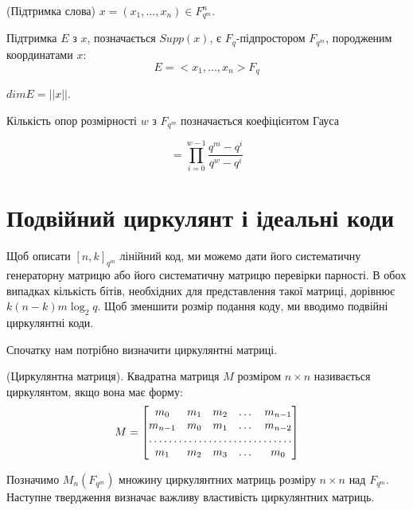 \begin{definition} (Підтримка слова)
    $x = (x_1, ..., x_n) \in F_{q^m}^n$. 

    Підтримка $E$ з $x$, позначається $Supp(x)$, є $F_q$-підпростором $F_{q^m}$, породженим координатами $x$:
    \begin{equation}
        E = <x_1,...,x_n>F_q
    \end{equation}

    $dimE = ||x||$.

    Кількість опор розмірності $w$ з $F_{q^m}$ позначається коефіцієнтом Гауса

    \begin{equation}
        [\dfrac{m}{w}] = \prod_{i=0}^{w-1} \dfrac{q^m - q^i}{q^w - q^i}
    \end{equation}
\end{definition}

\section{Подвійний циркулянт і ідеальні коди}

Щоб описати $[n,k]_{q^m}$ лінійний код, ми можемо дати його систематичну генераторну матрицю або його систематичну матрицю перевірки парності. 
В обох випадках кількість бітів, необхідних для представлення такої матриці, 
дорівнює $k(n-k)m \log_2 q$. Щоб зменшити розмір подання коду, ми вводимо подвійні циркулянтні коди.


Спочатку нам потрібно визначити циркулянтні матриці.

\begin{definition}
    (Циркулянтна матриця). Квадратна матриця $M$ розміром $n \times n$ називається циркулянтом,
    якщо вона має форму:
    \begin{equation}
        M = \begin{bmatrix}
            m_{0}       & m_{1} & m_{2} & \dots & m_{n-1} \\
            m_{n-1}     & m_{0} & m_{1} & \dots & m_{n-2} \\
            \hdotsfor{5} \\
            m_{1}       & m_{2} & m_{3} & \dots & m_{0}
        \end{bmatrix}
    \end{equation}
\end{definition}

Позначимо $M_n(F_{q^m})$ множину циркулянтних матриць розміру $n \times n$ над $F_{q^m}$.
Наступне твердження визначає важливу властивість циркулянтних матриць.

